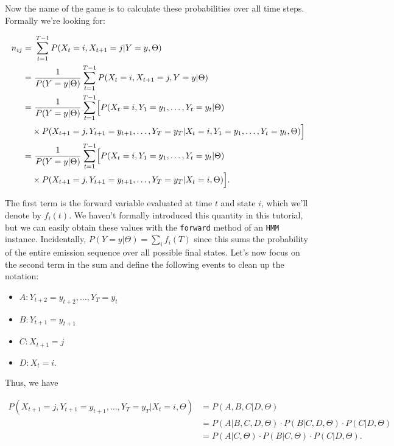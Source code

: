 Now the name of the game is to calculate these probabilities over all time steps. Formally we're looking for:

\begin{align*}
n_{ij}
=& \ \sum_{t=1}^{T-1} P(X_t=i, X_{t+1}=j|Y=y, \Theta) \\
=& \ \frac{1}{P(Y=y|\Theta)}
   \sum_{t=1}^{T-1} P(X_t=i, X_{t+1}=j, Y=y|\Theta) \\
=& \ \frac{1}{P(Y=y|\Theta)}
   \sum_{t=1}^{T-1} \Bigl[ P(X_t=i, Y_1=y_1, \ldots, Y_t=y_t|\Theta) \Bigr. \\
 & \times \Bigl. P(X_{t+1}=j, Y_{t+1}=y_{t+1}, \ldots, Y_T=y_T|X_t=i, Y_1=y_1, \ldots, Y_t=y_t, \Theta) \Bigr] \\
=& \ \frac{1}{P(Y=y|\Theta)}
   \sum_{t=1}^{T-1} \Bigl[ P(X_t=i, Y_1=y_1, \ldots, Y_t=y_t|\Theta) \Bigr. \\
 & \times \Bigl. P(X_{t+1}=j, Y_{t+1}=y_{t+1}, \ldots, Y_T=y_T|X_t=i, \Theta) \Bigr]. \\
\end{align*}

The first term is the forward variable evaluated at time $t$ and state $i$, which we'll denote by $f_i(t)$. We haven't formally introduced this quantity in this tutorial, but we can easily obtain these values with the \texttt{forward} method of an \texttt{HMM} instance. Incidentally, $P(Y=y|\Theta)=\sum_i f_i(T)$ since this sums the probability of the entire emission sequence over all possible final states. Let's now focus on the second term in the sum and define the following events to clean up the notation:

\begin{itemize}
\item $A: Y_{t+2}=y_{t+2}, \ldots, Y_T=y_t$
\item $B: Y_{t+1}=y_{t+1}$
\item $C: X_{t+1}=j$
\item $D: X_t=i$.
\end{itemize}

Thus, we have

\begin{align*}
P(X_{t+1}=j, Y_{t+1}=y_{t+1}, \ldots, Y_T=y_T|X_t=i, \Theta)
&= P(A, B, C|D, \Theta) \\
&= P(A|B, C, D, \Theta) \cdot P(B|C, D, \Theta) \cdot P(C|D, \Theta) \\
&= P(A|C, \Theta) \cdot P(B|C, \Theta) \cdot P(C|D, \Theta). \\
\end{align*}

